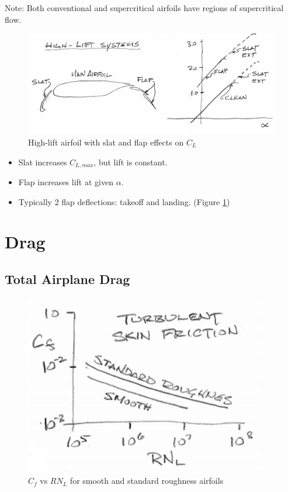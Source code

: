 \documentclass[draft=false, titlepage]{article}
\begin{document}
Note: Both conventional and supercritical airfoils have regions of supercritical flow.
\begin{figure}[ht]
	\centering
	\includegraphics[width=0.8\linewidth]{Figures/p61_highLiftSystems.PNG}
	\caption{High-lift airfoil with slat and flap effects on $C_L$}
	\label{fig:p61_highLiftSystems}
\end{figure}
\begin{itemize}
	\item Slat increases $C_{L,max}$, but lift is constant.
	\item Flap increases lift at given $\alpha$.
	\item Typically 2 flap deflections: takeoff and landing. (Figure \ref{fig:p61_highLiftSystems})
\end{itemize}

\section{Drag}
\subsection{Total Airplane Drag}
\begin{figure}[ht]
	\centering
	\includegraphics[width=0.4\linewidth]{Figures/p62_skinFriction.PNG}
	\caption{$C_f$ vs $RN_L$ for smooth and standard roughness airfoils}
	\label{fig:p62_skinFriction}
\end{figure}
\end{document}
